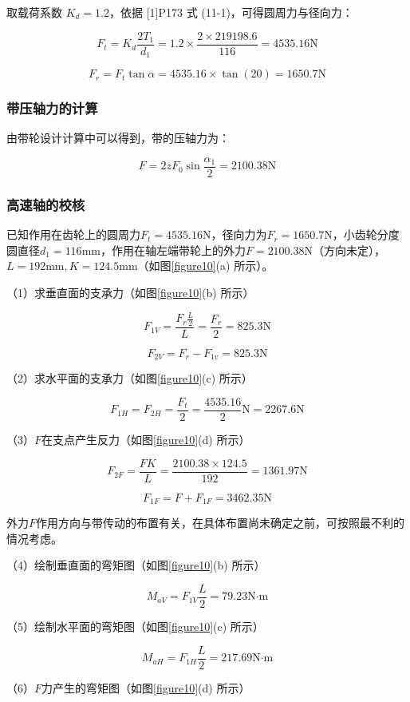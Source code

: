 \documentclass[12pt]{ctexart}
\begin{document}
取载荷系数 $K_d=1.2$，依据 [1]P173 式 (11-1)，可得圆周力与径向力：

$$F_t=K_d\frac{2T_1}{d_1}=1.2\times \frac{2\times 219198.6}{116}=4535.16\text{N}$$

$$F_r=F_t\tan{\alpha} = 4535.16\times \tan(20)=1650.7\text{N}$$

\subsubsection{带压轴力的计算}

由带轮设计计算中可以得到，带的压轴力为：

$$F = 2zF_0\sin \frac{\alpha_1}{2}=2100.38\text{N}$$

\subsubsection{高速轴的校核}

已知作用在齿轮上的圆周力$F_t=4535.16\text{N}$，径向力为$F_r=1650.7\text{N}$，小齿轮分度圆直径$d_1=116\text{mm}$，作用在轴左端带轮上的外力$F=2100.38\text{N}$（方向未定），$L=192\text{mm}, K=124.5\text{mm}$（如图\ref{figure10}(a) 所示）。

（1）求垂直面的支承力（如图\ref{figure10}(b) 所示）

$$F_{1V}=\frac{F_r\frac{L}{2}}{L}=\frac{F_r}{2}=825.3\text{N}$$

$$F_{2V}=F_r-F_{1v}=825.3\text{N}$$

（2）求水平面的支承力（如图\ref{figure10}(c) 所示）

$$F_{1H}=F_{2H}=\frac{F_t}{2}=\frac{4535.16}{2}\text{N}=2267.6\text{N}$$

（3）$F$在支点产生反力（如图\ref{figure10}(d) 所示）

$$F_{2F}=\frac{FK}{L}=\frac{2100.38\times 124.5}{192}=1361.97\text{N}$$

$$F_{1F}=F+F_{1F}=3462.35\text{N}$$

外力$F$作用方向与带传动的布置有关，在具体布置尚未确定之前，可按照最不利的情况考虑。

（4）绘制垂直面的弯矩图（如图\ref{figure10}(b) 所示）

$$M_{aV}=F_{1V}\frac{L}{2}=79.23\text{N·m}$$

（5）绘制水平面的弯矩图（如图\ref{figure10}(c) 所示）

$$M_{aH}=F_{1H}\frac{L}{2}=217.69\text{N·m}$$

（6）$F$力产生的弯矩图（如图\ref{figure10}(d) 所示）
\end{document}
